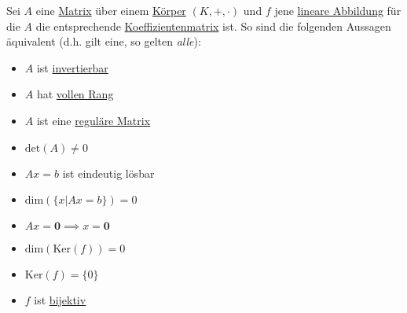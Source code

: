 \documentclass[../../main.tex]{subfiles}
\begin{document}
	\begin{theorem}
		Sei $A$ eine \hyperref[def:Matrix]{Matrix} über einem \hyperref[def:Körper]{Körper} $(K,+,\cdot)$ und $f$ jene \hyperref[def:LineareAbbildung]{lineare Abbildung} für die $A$ die entsprechende \hyperref[def:KoeffizientenmatrixEinerLinearenAbbildung]{Koeffizientenmatrix} ist. So sind die folgenden Aussagen äquivalent (d.h. gilt eine, so gelten \textit{alle}):
		\begin{multicols}{2}
			\begin{itemize}
				\item $A$ ist \hyperref[def:invertierbareMatrix]{invertierbar}
				\item $A$ hat \hyperref[def:vollerRang]{vollen Rang}
				\item $A$ ist eine \hyperref[def:reguläreMatrix]{reguläre Matrix}
				\item $\textrm{det}(A) \not= 0$
				\item $Ax = b$ ist eindeutig lösbar
				\item $\textrm{dim}(\{x | Ax=b\})=0$
				\item $Ax = \mathbf{0} \implies x = \mathbf{0}$
				\item $\textrm{dim}(\textrm{Ker}(f))=0$
				\item $\textrm{Ker}(f)=\{0\}$
				\item $f$ ist \hyperref[def:Bijektiv]{bijektiv}
			\end{itemize}
		\end{multicols}
	\end{theorem}
	
\end{document}
